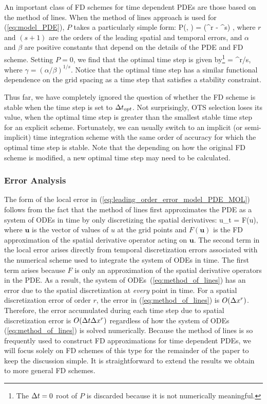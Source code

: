 \documentclass[oneeqnum,onefignum,onetabnum,onethmnum]{siamltex}
\begin{document}
An important class of FD schemes for time dependent PDEs are those based
on the method of lines.   When the method of lines approach is used for 
(\ref{eq:model_PDE}), $P$ takes a particularly simple 
form:
\beq
  P(\dx, \dt) = (\alpha \dx^r - \beta \dt^s) \dt,
  \label{eq:leading_order_error_model_PDE_MOL}
\eeq
where $r$ and $(s+1)$ are the orders of the leading spatial and temporal 
errors, and $\alpha$ and $\beta$ are positive constants that depend on the 
details of the PDE and FD scheme.  Setting $P = 0$, we find that the optimal 
time step is given by\footnote{The $\Delta t = 0$ root of $P$ is discarded 
because it is not numerically meaningful.}
\beq
  \dto = \gamma \dx^{r/s},
  \label{eq:optimal_time_step}
\eeq
where $\gamma = (\alpha/\beta)^{1/s}$.  Notice that the optimal time step 
has a similar functional dependence on the grid spacing as a time step that 
satisfies a stability constraint.  

Thus far, we have completely ignored the question of whether the FD scheme is 
stable when the time step is set to $\Delta t_{opt}$.  Not surprisingly, OTS selection 
loses its value, when the optimal time step is greater than the smallest 
stable time step for an explicit scheme.  Fortunately, we can usually switch 
to an implicit (or semi-implicit) time integration scheme with the same order 
of accuracy for which the optimal time step is stable.  Note that the 
depending on how the original FD scheme is modified, a new optimal time step 
may need to be calculated.  


\subsubsection*{\label{sec:error_analysis} 
            Error Analysis}
The form of the local error in 
(\ref{eq:leading_order_error_model_PDE_MOL}) follows from the fact 
that the method of lines first approximates the PDE as a system of ODEs in 
time by only discretizing the spatial derivatives: 
\beq
{\mathbf u}_t = F({\mathbf u}),
\label{eq:method_of_lines}
\eeq
where ${\mathbf u}$ is the vector of values of $u$ at the grid points and
$F({\mathbf u})$ is the FD approximation of the spatial derivative 
operator acting on ${\mathbf u}$.  The second term in the local error arises 
directly from temporal discretization errors associated with the numerical 
scheme used to integrate the system of ODEs in time.  The first term arises 
because $F$ is only an approximation of the spatial derivative operators in 
the PDE.  As a result, the system of ODEs~(\ref{eq:method_of_lines}) has an 
error due to the spatial discretization at \emph{every} point in time.  For 
a spatial discretization error of order $r$, the error in 
(\ref{eq:method_of_lines}) is $O(\Delta x^r)$.  Therefore, the error 
accumulated during each time step due to spatial discretization error is 
$O(\Delta t \Delta x^r)$ regardless of how the system of ODEs (\ref{eq:method_of_lines})
is solved numerically.  Because the method of lines is so frequently used to 
construct FD approximations for time dependent PDEs, we will focus solely on 
FD schemes of this type for the remainder of the paper to keep the discussion 
simple.  It is straightforward to extend the results we obtain to more general 
FD schemes. 
\end{document}

